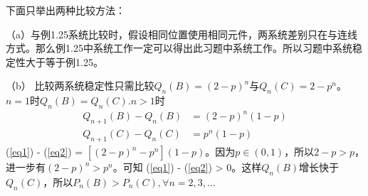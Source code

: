 \documentclass[14pt]{scrartcl} %
\numberwithin{equation}{section} %
\numberwithin{figure}{section} %
\numberwithin{table}{section} %
\begin{document}
	下面只举出两种比较方法：
	
	
	（a）与例1.25系统比较时，假设相同位置使用相同元件，两系统差别只在与连线方式。那么例1.25中系统工作一定可以得出此习题中系统工作。所以习题中系统稳定性大于等于例1.25。
	
	（b） 比较两系统稳定性只需比较$Q_n(B) = (2 - p) ^ n$与$Q_n(C) = 2 - p ^ n$。$n = 1$时$Q_n(B) = Q_n(C)$.$n >1$时
	\begin{align}
		Q_{n + 1}(B) - Q_n(B) & = (2 - p) ^ n(1 - p) \label{eq1}\\
		Q_{n + 1}(C) - Q_n(C) & = p ^ n(1 - p) \label{eq2}
	\end{align}
	(\ref{eq1}) - (\ref{eq2}) = $[(2 - p) ^ n - p ^ n](1 - p)$。因为$p \in(0, 1)$，所以$2 - p > p$，进一步有$(2 - p) ^ n > p ^ n$。可知 (\ref{eq1}) - (\ref{eq2}) > 0。这样$Q_n(B)$增长快于$Q_n(C)$，所以$P_n(B) > P_n(C), \forall n = 2, 3, \dots$
	
\end{document}
